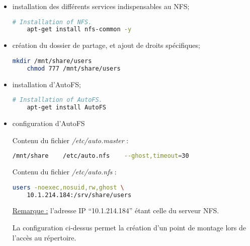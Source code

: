 \begin{itemize}
\item installation des différents services indispensables au NFS;

  \begin{lstlisting}[language=bash]
    # Installation of NFS.
    apt-get install nfs-common -y
  \end{lstlisting}

    \item création du dossier de partage, et ajout de droits
      spécifiques;

  \begin{lstlisting}[language=bash]
    mkdir /mnt/share/users
    chmod 777 /mnt/share/users
  \end{lstlisting}

\item installation d'AutoFS;

  \begin{lstlisting}[language=bash]
    # Installation of AutoFS.
    apt-get install AutoFS
  \end{lstlisting}

\item configuration d'AutoFS

  Contenu du fichier \textit{/etc/auto.master} :

  \begin{lstlisting}[language=bash]
    /mnt/share    /etc/auto.nfs    --ghost,timeout=30
  \end{lstlisting}

  Contenu du fichier \textit{/etc/auto.nfs} :

  \begin{lstlisting}[language=bash]
    users -noexec,nosuid,rw,ghost \
    10.1.214.184:/srv/share/users
  \end{lstlisting}

  \underline{Remarque :} l'adresse IP ``10.1.214.184'' étant celle du serveur NFS.

  La configuration ci-dessus permet la création d'un point de montage lors de
  l'accès au répertoire.
\end{itemize}


